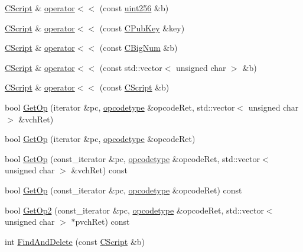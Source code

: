 \begin{DoxyCompactItemize}
\item 
\hyperlink{class_c_script}{C\+Script} \& \hyperlink{class_c_script_a5711a24350f1d24baa88d23ed1ca5868}{operator$<$$<$} (const \hyperlink{classuint256}{uint256} \&b)
\item 
\hyperlink{class_c_script}{C\+Script} \& \hyperlink{class_c_script_a90ca62e4cd7e8c6e90a397f42d6b0564}{operator$<$$<$} (const \hyperlink{class_c_pub_key}{C\+Pub\+Key} \&key)
\item 
\hyperlink{class_c_script}{C\+Script} \& \hyperlink{class_c_script_a05fc4f7c67388701e4af16e8c1d66727}{operator$<$$<$} (const \hyperlink{class_c_big_num}{C\+Big\+Num} \&b)
\item 
\hyperlink{class_c_script}{C\+Script} \& \hyperlink{class_c_script_a6e58790e9f280dd7272ca0d81459b6ef}{operator$<$$<$} (const std\+::vector$<$ unsigned char $>$ \&b)
\item 
\hyperlink{class_c_script}{C\+Script} \& \hyperlink{class_c_script_aa47d739da94465950b3977c04a49f089}{operator$<$$<$} (const \hyperlink{class_c_script}{C\+Script} \&b)
\item 
bool \hyperlink{class_c_script_a94635ed93d8d244ec3acfa83f9ecfe5f}{Get\+Op} (iterator \&pc, \hyperlink{script_8h_a63e349a6089a54da9fe09a3d858648bd}{opcodetype} \&opcode\+Ret, std\+::vector$<$ unsigned char $>$ \&vch\+Ret)
\item 
bool \hyperlink{class_c_script_a913b6f84ecb7ae584200279fa0c064a9}{Get\+Op} (iterator \&pc, \hyperlink{script_8h_a63e349a6089a54da9fe09a3d858648bd}{opcodetype} \&opcode\+Ret)
\item 
bool \hyperlink{class_c_script_ae06205f908e430eaf428922ea3997c1b}{Get\+Op} (const\+\_\+iterator \&pc, \hyperlink{script_8h_a63e349a6089a54da9fe09a3d858648bd}{opcodetype} \&opcode\+Ret, std\+::vector$<$ unsigned char $>$ \&vch\+Ret) const 
\item 
bool \hyperlink{class_c_script_aa1149c27eb60be775652ca862bcb0e23}{Get\+Op} (const\+\_\+iterator \&pc, \hyperlink{script_8h_a63e349a6089a54da9fe09a3d858648bd}{opcodetype} \&opcode\+Ret) const 
\item 
bool \hyperlink{class_c_script_a93ec95275ccce9b701c8f53c57cd7975}{Get\+Op2} (const\+\_\+iterator \&pc, \hyperlink{script_8h_a63e349a6089a54da9fe09a3d858648bd}{opcodetype} \&opcode\+Ret, std\+::vector$<$ unsigned char $>$ $\ast$pvch\+Ret) const 
\item 
int \hyperlink{class_c_script_aad6e9f84fe8aa2d27a979f1bc2732463}{Find\+And\+Delete} (const \hyperlink{class_c_script}{C\+Script} \&b)
\item 

\end{DoxyCompactItemize}
